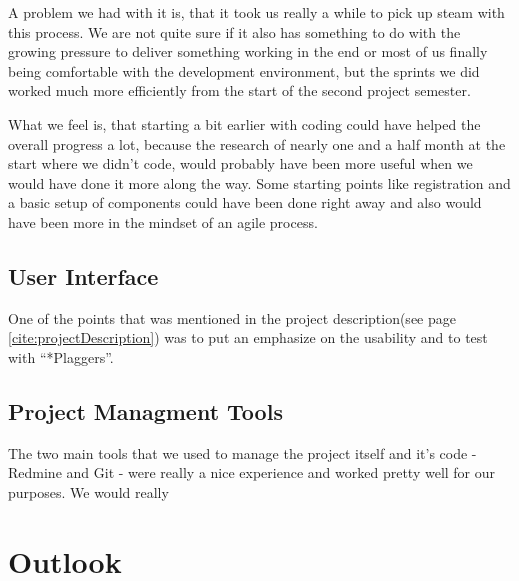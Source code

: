 A problem we had with it is, that it took us really a while to pick up steam with this process. We are not quite sure if it also has something to do with the growing pressure to deliver something working in the end or most of us finally being comfortable with the development environment, but the sprints we did worked much more efficiently from the start of the second project semester.

What we feel is, that starting a bit earlier with coding could have helped the overall progress a lot, because the research of nearly one and a half month at the start where we didn't code, would probably have been more useful when we would have done it more along the way. Some starting points like registration and a basic setup of components could have been done right away and also would have been more in the mindset of an agile process.

\subsection{User Interface}

One of the points that was mentioned in the project description(see page \ref{cite:projectDescription}) was to put an emphasize on the usability and to test with \enquote{*Plaggers}.

\subsection{Project Managment Tools}

The two main tools that we used to manage the project itself and it's code - Redmine and Git - were really a nice experience and worked pretty well for our purposes. We would really

\section{Outlook}

